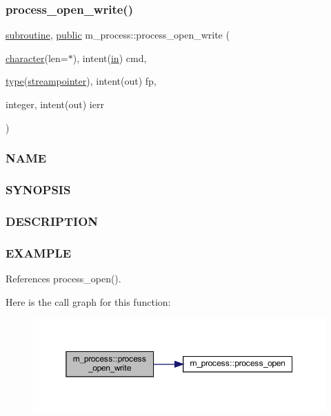 \subsubsection{\texorpdfstring{process\+\_\+open\+\_\+write()}{process\_open\_write()}}
{\footnotesize\ttfamily \hyperlink{M__stopwatch_83_8txt_acfbcff50169d691ff02d4a123ed70482}{subroutine}, \hyperlink{M__stopwatch_83_8txt_a2f74811300c361e53b430611a7d1769f}{public} m\+\_\+process\+::process\+\_\+open\+\_\+write (\begin{DoxyParamCaption}\item[{\hyperlink{option__stopwatch_83_8txt_abd4b21fbbd175834027b5224bfe97e66}{character}(len=$\ast$), intent(\hyperlink{M__journal_83_8txt_afce72651d1eed785a2132bee863b2f38}{in})}]{cmd,  }\item[{\hyperlink{stop__watch_83_8txt_a70f0ead91c32e25323c03265aa302c1c}{type}(\hyperlink{structm__process_1_1streampointer}{streampointer}), intent(out)}]{fp,  }\item[{integer, intent(out)}]{ierr }\end{DoxyParamCaption})}



\subsubsection*{N\+A\+ME}

\subsubsection*{S\+Y\+N\+O\+P\+S\+IS}

\subsubsection*{D\+E\+S\+C\+R\+I\+P\+T\+I\+ON}

\subsubsection*{E\+X\+A\+M\+P\+LE}

References process\+\_\+open().

Here is the call graph for this function\+:
\nopagebreak
\begin{figure}[H]
\begin{center}
\leavevmode
\includegraphics[width=350pt]{namespacem__process_aa6ed1404ab3472f5068ed15a7a01defc_cgraph}
\end{center}
\end{figure}
\mbox{\label{namespacem__process_a7dd759a1344789477ae1e205d7fa9a51}} 
